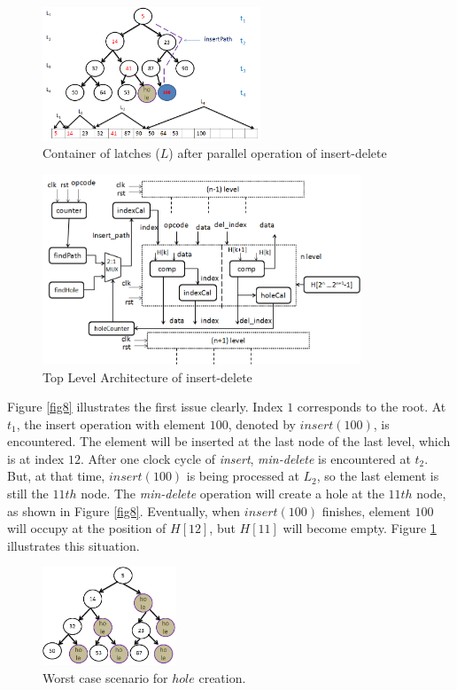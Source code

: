 \documentclass[10pt, conference, compsocconf]{IEEEtran}
\begin{document}
\begin{figure}[!ht]
  \centering
  \includegraphics[width=6.5cm]{Figures/9.png}
      \caption{Container of latches ($L$) after parallel operation of insert-delete}
    \label{fig9}
\end{figure}

\begin{figure}[!ht]
  \centering
  \includegraphics[width=9.5cm]{Figures/2.png}
      \caption{Top Level Architecture of insert-delete}
    \label{fig10}
\end{figure}

Figure \ref{fig8} illustrates the first issue clearly.
Index $1$ corresponds to the root.
At $t_1$, the insert operation with element $100$, denoted by $insert(100)$, is encountered.
The element will be inserted at the last node of the last level, which is at index $12$.
After one clock cycle of {\it insert}, {\it min-delete} is encountered at $t_2$.
But, at that time, $insert(100)$ is being processed at $L_2$, so the last element is still the $11th$ node.
The {\it min-delete} operation will create a hole at the $11th$ node, as shown in Figure \ref{fig8}.
Eventually, when $insert(100)$ finishes, element $100$ will occupy at the position of $H[12]$, but $H[11]$ will become empty.
Figure \ref{fig9} illustrates this situation.

\begin{figure}[!ht]
  \centering
  \includegraphics[width=4cm]{Figures/hole.png}
      \caption{Worst case scenario for $hole$ creation.}
    \label{hole}
\end{figure}
\end{document}
